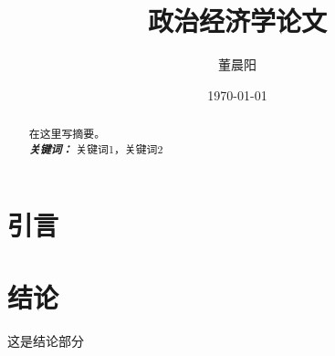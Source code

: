 \documentclass[a4paper]{ctexart}
\title{政治经济学论文}
\author{董晨阳}
\date{\today}
\providecommand{\keywords}[1]{\\\textbf{\textit{关键词：}} #1}
\begin{document}
\maketitle
\begin{abstract}
在这里写摘要。
\keywords{关键词1，关键词2}
\end{abstract}
\clearpage

\section{引言}

\section{结论}
这是结论部分\autocite{vaswani2017attention}
\printbibliography[heading=bibliography,title=参考文献]
\end{document}
